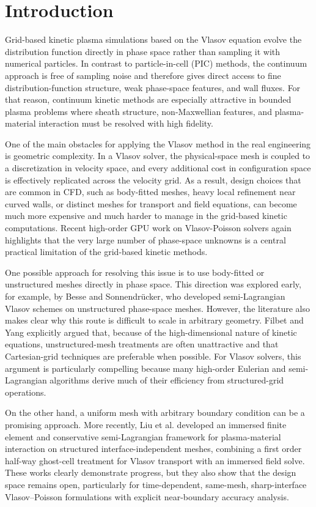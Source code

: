 \section{Introduction}
Grid-based kinetic plasma simulations based on the Vlasov equation evolve the distribution function directly in phase space rather than sampling it with numerical particles. In contrast to particle-in-cell (PIC) methods, the continuum approach is free of sampling noise and therefore gives direct access to fine distribution-function structure, weak phase-space features, and wall fluxes. For that reason, continuum kinetic methods are especially attractive in bounded plasma problems where sheath structure, non-Maxwellian features, and plasma-material interaction must be resolved with high fidelity. 

One of the main obstacles for applying the Vlasov method in the real engineering is geometric complexity. In a Vlasov solver, the physical-space mesh is coupled to a discretization in velocity space, and every additional cost in configuration space is effectively replicated across the velocity grid. As a result, design choices that are common in CFD, such as body-fitted meshes, heavy local refinement near curved walls, or distinct meshes for transport and field equations, can become much more expensive and much harder to manage in the grid-based kinetic computations. Recent high-order GPU work on Vlasov-Poisson solvers again highlights that the very large number of phase-space unknowns is a central practical limitation of the grid-based kinetic methods.

One possible approach for resolving this issue is to use body-fitted or unstructured meshes directly in phase space. This direction was explored early, for example, by Besse and Sonnendrücker, who developed semi-Lagrangian Vlasov schemes on unstructured phase-space meshes. However, the literature also makes clear why this route is difficult to scale in arbitrary geometry. Filbet and Yang explicitly argued that, because of the high-dimensional nature of kinetic equations, unstructured-mesh treatments are often unattractive and that Cartesian-grid techniques are preferable when possible. For Vlasov solvers, this argument is particularly compelling because many high-order Eulerian and semi-Lagrangian algorithms derive much of their efficiency from structured-grid operations.

On the other hand, a uniform mesh with arbitrary boundary condition can be a promising approach. More recently, Liu et al. developed an immersed finite element and conservative semi-Lagrangian framework for plasma-material interaction on structured interface-independent meshes, combining a first order half-way ghost-cell treatment for Vlasov transport with an immersed field solve. These works clearly demonstrate progress, but they also show that the design space remains open, particularly for time-dependent, same-mesh, sharp-interface Vlasov–Poisson formulations with explicit near-boundary accuracy analysis.

